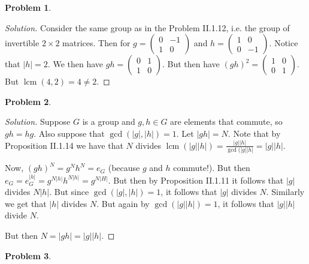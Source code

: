 \documentclass{article}
\theoremstyle{definition}
\newtheorem{problem-internal}{Problem}[subsection]
\newenvironment{problem}{
	\medskip
	\begin{problem-internal}
	}{
\end{problem-internal}
}
\newenvironment{solution}{
	\begin{proof}[Solution]
		\vspace{-8px}
		\setlength{\parskip}{4px}
		\setlength{\parindent}{0px}
	}{
\end{proof}
}
\newcommand{\abs}[1]{\left|#1\right|}
\DeclareMathOperator{\lcm}{lcm}
\begin{document}
\begin{problem}
\end{problem}

\begin{solution}
	Consider the same group as in the Problem II.1.12, i.e. the group of invertible $2 \times 2$ matrices. Then for $g =
	\begin{pmatrix}
		0 & -1\\
		1 & 0
	\end{pmatrix}$ and $h =
	\begin{pmatrix}
		1 & 0\\
		0 & -1
	\end{pmatrix}$. Notice that $\abs{h}=2$. We then have $gh =
	\begin{pmatrix}
		0 & 1\\
		1 & 0
	\end{pmatrix}$. But then have $(gh)^2 =
	\begin{pmatrix}
		1 & 0\\
		0 & 1
	\end{pmatrix}$. But $\lcm(4,2)=4\neq2$.
\end{solution}

\begin{problem}
\end{problem}

\begin{solution}
	Suppose $G$ is a group and $g,h \in G$ are elements that commute, so $gh = hg$. Also suppose that $\gcd(\abs{g},\abs{h})=1$. Let $\abs{gh}=N$. Note that by Proposition II.1.14 we have that $N$ divides $\lcm(\abs{g}\abs{h})=\frac{\abs{g}\abs{h}}{\gcd(\abs{g}\abs{h}}=\abs{g}\abs{h}$.
	
	Now, $(gh)^N=g^Nh^N=e_G$ (because $g$ and $h$ commute!). But then $e_G=e_G^{\abs{h}}=g^{N\abs{h}}h^{N\abs{h}}=g^{N\abs{H}}$. But then by Proposition II.1.11 it follows that $\abs{g}$ divides $N\abs{h}$. But since $\gcd(\abs{g},\abs{h})=1$, it follows that $\abs{g}$ divides $N$. Similarly we get that $\abs{h}$ divides $N$. But again by $\gcd(\abs{g}\abs{h})=1$, it follows that $\abs{g}\abs{h}$ divide $N$.
	
	But then $N = \abs{gh} = \abs{g}\abs{h}$. 
\end{solution}

\begin{problem}
\end{problem}
\end{document}
